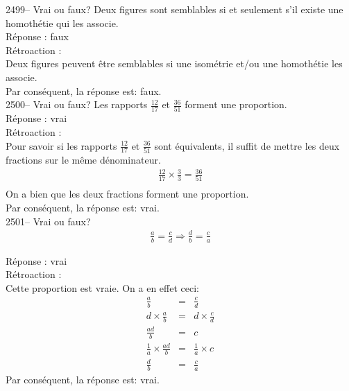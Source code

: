 \documentclass[letterpaper, 12pt]{article}
\begin{document}
2499--  Vrai ou faux? Deux figures sont semblables si et seulement s'il existe une homoth\'etie qui les associe.\\

R\'eponse : faux\\

R\'etroaction :\\
Deux figures peuvent \^etre semblables si une isom\'etrie et/ou une homoth\'etie les associe.\\
Par cons\'equent, la r\'eponse est: faux.\\

2500-- Vrai ou faux? Les rapports  $\frac{12}{17}$ et $\frac{36}{51}$ forment une proportion.\\

R\'eponse : vrai\\

R\'etroaction :\\
Pour savoir si les rapports $\frac{12}{17}$ et $\frac{36}{51}$ sont \'equivalents, il suffit de mettre les deux fractions sur le m\^eme d\'enominateur.\\
\begin{eqnarray*}
  \frac{12}{17}\times \frac{3}{3} = \frac{36}{51}\\
\end{eqnarray*}
On a bien que les deux fractions forment une proportion.\\
Par cons\'equent, la r\'eponse est: vrai.\\

2501-- Vrai ou faux? \\
\begin{eqnarray*}
  \frac{a}{b} = \frac{c}{d}  \Longrightarrow \frac{d}{b} = \frac{c}{a}
\end{eqnarray*}

R\'eponse : vrai\\

R\'etroaction :\\
Cette proportion est vraie. On a en effet ceci:
\begin{eqnarray*}
  \frac{a}{b} &=& \frac{c}{d}  \\[2mm]
  d \times \frac{a}{b} &=& d \times \frac{c}{d}  \\[2mm]
\frac{ad}{b} &=& c \\[2mm]
 \frac{1}{a} \times \frac{ad}{b}  &=&  \frac{1}{a} \times c \\[2mm]
\frac{d}{b}  &=&  \frac{c}{a}
\end{eqnarray*}
Par cons\'equent, la r\'eponse est: vrai.\\
\end{document}
